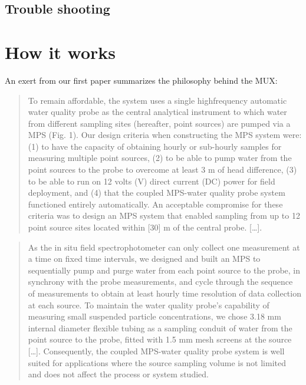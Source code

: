 \documentclass[]{book}
\begin{document}
\hypertarget{trouble-shooting}{%
\section{Trouble shooting}\label{trouble-shooting}}

\hypertarget{how-it-works-1}{%
\chapter{How it works}\label{how-it-works-1}}

An exert from our first paper \citep{Birgand2016-to} summarizes the philosophy behind the MUX:

\begin{quote}
To remain affordable, the system uses a single highfrequency automatic water quality probe as the central analytical
instrument to which water from different sampling sites (hereafter, point sources) are pumped via a MPS (Fig. 1). Our design criteria when constructing the MPS system were: (1) to have the capacity of obtaining hourly or sub-hourly samples for measuring multiple point sources, (2) to be able to pump water from the point sources to the probe to overcome at least 3 m of head difference, (3) to be able to run on 12 volts (V) direct current (DC) power for field deployment, and (4) that the coupled MPS-water quality probe system functioned entirely automatically. An acceptable compromise for these criteria was to design an MPS system that enabled sampling from up to 12 point source sites located within {[}30{]} m of the central probe. {[}\ldots{}{]}.
\end{quote}

\begin{quote}
As the in situ field spectrophotometer can only collect one measurement at a time on fixed time intervals, we designed and built an MPS to sequentially pump and purge water from each point source to the probe, in synchrony with the probe measurements, and cycle through the sequence of measurements to obtain at least hourly time resolution of data collection at each source. To maintain the water quality probe's capability of measuring small suspended particle concentrations, we chose 3.18 mm internal diameter flexible tubing as a sampling conduit of water from the point source to the probe, fitted with 1.5 mm mesh screens at the source {[}\ldots{}{]}. Consequently, the coupled MPS-water quality probe system is well suited for applications where the source sampling volume is not limited and does not affect the process or system studied.
\end{quote}
\end{document}
